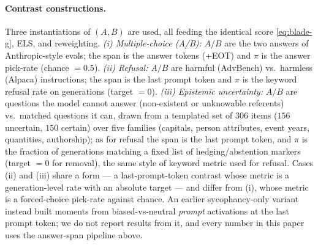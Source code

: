 \paragraph{Contrast constructions.}
\label{sec:contrasts}
Three instantiations of $(A,B)$ are used, all feeding the identical score \eqref{eq:blade-g}, ELS, and reweighting. \emph{(i) Multiple-choice (A/B):} $A/B$ are the two answers of Anthropic-style evals; the span is the answer tokens ($+$EOT) and $\pi$ is the answer pick-rate (chance $=0.5$). \emph{(ii) Refusal:} $A/B$ are harmful (AdvBench) vs.\ harmless (Alpaca) instructions; the span is the last prompt token and $\pi$ is the keyword refusal rate on generations (target $=0$). \emph{(iii) Epistemic uncertainty:} $A/B$ are questions the model cannot answer (non-existent or unknowable referents) vs.\ matched questions it can, drawn from a templated set of $306$ items ($156$ uncertain, $150$ certain) over five families (capitals, person attributes, event years, quantities, authorship); as for refusal the span is the last prompt token, and $\pi$ is the fraction of generations matching a fixed list of hedging/abstention markers (target $=0$ for removal), the same style of keyword metric used for refusal. Cases (ii) and (iii) share a form --- a last-prompt-token contrast whose metric is a generation-level rate with an absolute target --- and differ from (i), whose metric is a forced-choice pick-rate against chance. An earlier sycophancy-only variant instead built moments from biased-vs-neutral \emph{prompt} activations at the last prompt token; we do not report results from it, and every number in this paper uses the answer-span pipeline above.